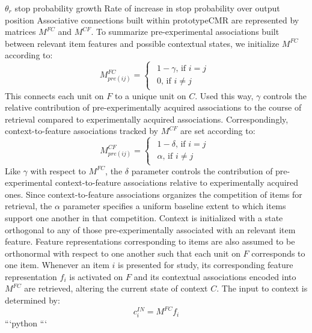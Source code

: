 {{}%
{${\theta}_{r}$}%
{stop probability growth}%
{Rate of increase in stop probability over output position}%
}%
\markdownRendererInterblockSeparator
{}\markdownRendererInterblockSeparator
{}Associative connections built within prototypeCMR are represented by matrices $M^{FC}$ and $M^{CF}$.\markdownRendererInterblockSeparator
{}To summarize pre-experimental associations built between relevant item features and possible contextual states, we initialize $M^{FC}$ according to:\markdownRendererInterblockSeparator
{}\begin{equation} \label{eq:1} M^{FC}_{pre(ij)} = \begin{cases} \begin{alignedat}{2} 1 - \gamma \text{, if } i=j \\ 0 \text{, if } i \neq j \end{alignedat} \end{cases} \end{equation}\markdownRendererInterblockSeparator
{}This connects each unit on $F$ to a unique unit on $C$. Used this way, $\gamma$ controls the relative contribution of pre-experimentally acquired associations to the course of retrieval compared to experimentally acquired associations. Correspondingly, context-to-feature associations tracked by $M^{CF}$ are set according to:\markdownRendererInterblockSeparator
{}\begin{equation} \label{eq:2} M^{CF}_{pre(ij)} = \begin{cases} \begin{alignedat}{2} 1 - \delta \text{, if } i=j \\ \alpha \text{, if } i \neq j \end{alignedat} \end{cases} \end{equation}\markdownRendererInterblockSeparator
{}Like $\gamma$ with respect to $M^{FC}$, the $\delta$ parameter controls the contribution of pre-experimental context-to-feature associations relative to experimentally acquired ones. Since context-to-feature associations organizes the competition of items for retrieval, the $\alpha$ parameter specifies a uniform baseline extent to which items support one another in that competition.\markdownRendererInterblockSeparator
{}Context is initialized with a state orthogonal to any of those pre-experimentally associated with an relevant item feature. Feature representations corresponding to items are also assumed to be orthonormal with respect to one another such that each unit on $F$ corresponds to one item.\markdownRendererInterblockSeparator
{}\markdownRendererInterblockSeparator
{}Whenever an item $i$ is presented for study, its corresponding feature representation $f_i$ is activated on $F$ and its contextual associations encoded into $M^{FC}$ are retrieved, altering the current state of context $C$.\markdownRendererInterblockSeparator
{}The input to context is determined by:\markdownRendererInterblockSeparator
{}\begin{equation} \label{eq:3} c^{IN}_{i} = M^{FC}f_{i} \end{equation}\markdownRendererInterblockSeparator
{}```python\markdownRendererInterblockSeparator
{}```\relax
